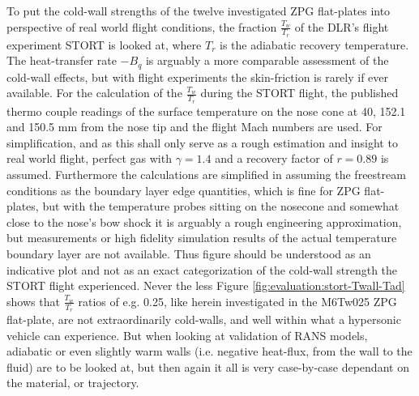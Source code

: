 To put the cold-wall strengths of the twelve investigated ZPG flat-plates into perspective of real world flight conditions, the fraction \(\frac{T_w}{T_{r}}\) of the DLR's flight experiment STORT is looked at, where \(T_r\) is the adiabatic recovery temperature. The heat-transfer rate \(-B_q\) is arguably a more comparable assessment of the cold-wall effects, but with flight experiments the skin-friction is rarely if ever available. For the calculation of the \(\frac{T_w}{T_r}\) during the STORT flight, the published thermo couple readings of the surface temperature on the nose cone at 40, 152.1 and 150.5 mm from the nose tip \cite[Figure 10]{reimer2025stort} and the flight Mach numbers \cite[Figure 9 (b)]{reimer2025stort} are used. For simplification, and as this shall only serve as a rough estimation and insight to real world flight, perfect gas with \(\gamma = 1.4\) and a recovery factor of \(r = 0.89\) is assumed. Furthermore the calculations are simplified in assuming the freestream conditions as the boundary layer edge quantities, which is fine for ZPG flat-plates, but with the temperature probes sitting on the nosecone and somewhat close to the nose's bow shock it is arguably a rough engineering approximation, but measurements or high fidelity simulation results of the actual temperature boundary layer are not available. Thus figure should be understood as an indicative plot and not as an exact categorization of the cold-wall strength the STORT flight experienced. Never the less Figure \ref{fig:evaluation:stort-Twall-Tad} shows that \(\frac{T_w}{T_r}\) ratios of e.g. 0.25, like herein investigated in the M6Tw025 ZPG flat-plate, are not extraordinarily cold-walls, and well within what a hypersonic vehicle can experience. But when looking at validation of RANS models, adiabatic or even slightly warm walls (i.e. negative heat-flux, from the wall to the fluid) are to be looked at, but then again it all is very case-by-case dependant on the material, or trajectory.

